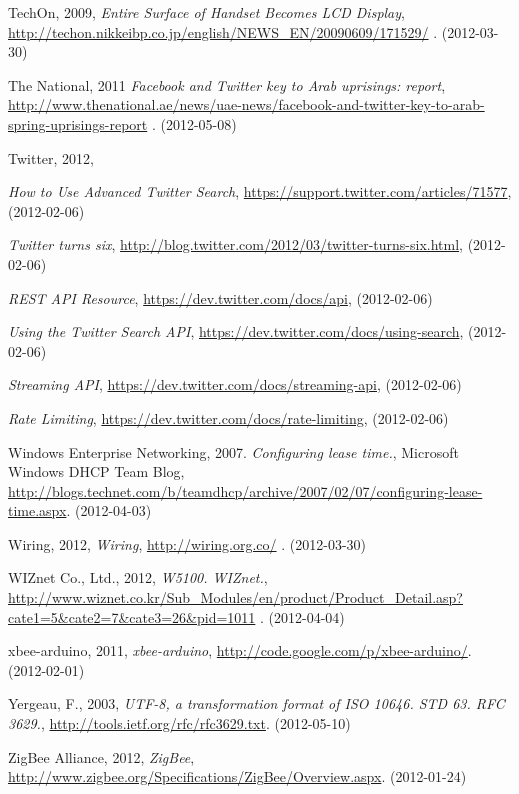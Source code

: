 \documentclass[a4paper,11pt]{article}
\newcounter{qcounter}
\begin{document}
\begin{thebibliography}{9}
\label{techon}
    TechOn, 2009,
    \emph{Entire Surface of Handset Becomes LCD Display},
    \url{http://techon.nikkeibp.co.jp/english/NEWS_EN/20090609/171529/}
    . (2012-03-30)

\label{national}
    The National, 2011
    \emph{Facebook and Twitter key to Arab uprisings: report},
    \url{http://www.thenational.ae/news/uae-news/facebook-and-twitter-key-to-arab-spring-uprisings-report}
    . (2012-05-08)

\label{twitter}
    Twitter, 2012,
    \begin{list}{[]}{}
    \item \emph{How to Use Advanced Twitter Search}, \url{https://support.twitter.com/articles/71577}, (2012-02-06)
    \item \emph{Twitter turns six}, \url{http://blog.twitter.com/2012/03/twitter-turns-six.html}, (2012-02-06)
    \item \emph{REST API Resource}, \url{https://dev.twitter.com/docs/api}, (2012-02-06)
    \item \emph{Using the Twitter Search API}, \url{https://dev.twitter.com/docs/using-search}, (2012-02-06)
    \item \emph{Streaming API}, \url{https://dev.twitter.com/docs/streaming-api}, (2012-02-06)
    \item \emph{Rate Limiting}, \url{https://dev.twitter.com/docs/rate-limiting}, (2012-02-06)
    \end{list}

\label{wen}
    Windows Enterprise Networking, 2007.
    \emph{Configuring lease time.},
    Microsoft Windows DHCP Team Blog,
    \url{http://blogs.technet.com/b/teamdhcp/archive/2007/02/07/configuring-lease-time.aspx}. (2012-04-03)

\label{wiring}
    Wiring, 2012,
    \emph{Wiring},
    \url{http://wiring.org.co/}
    . (2012-03-30)

\label{wiznet}
    WIZnet Co., Ltd., 2012,
    \emph{W5100.  WIZnet.},
    \url{http://www.wiznet.co.kr/Sub_Modules/en/product/Product_Detail.asp?cate1=5&cate2=7&cate3=26&pid=1011}
    . (2012-04-04)

\label{xbeearduino}
xbee-arduino, 2011,
\emph{xbee-arduino},
\url{http://code.google.com/p/xbee-arduino/}. (2012-02-01)

\label{yergeau}
\label{rfc2277}
Yergeau, F., 2003,
\emph{UTF-8, a transformation format of ISO 10646. STD 63. RFC 3629.},
\url{http://tools.ietf.org/rfc/rfc3629.txt}. (2012-05-10)

\label{zigbee}
    ZigBee Alliance, 2012,
    \emph{ZigBee},
    \url{http://www.zigbee.org/Specifications/ZigBee/Overview.aspx}. (2012-01-24)

\end{thebibliography}
\end{document}
